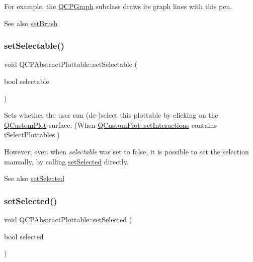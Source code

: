 For example, the \mbox{\hyperlink{class_q_c_p_graph}{Q\+C\+P\+Graph}} subclass draws its graph lines with this pen.

\begin{DoxySeeAlso}{See also}
\mbox{\hyperlink{class_q_c_p_abstract_plottable_a7a4b92144dca6453a1f0f210e27edc74}{set\+Brush}} 
\end{DoxySeeAlso}
\mbox{\label{class_q_c_p_abstract_plottable_a22c69299eb5569e0f6bf084877a37dc4}} 
\subsubsection{\texorpdfstring{set\+Selectable()}{setSelectable()}}
{\footnotesize\ttfamily void Q\+C\+P\+Abstract\+Plottable\+::set\+Selectable (\begin{DoxyParamCaption}\item[{bool}]{selectable }\end{DoxyParamCaption})}

Sets whether the user can (de-\/)select this plottable by clicking on the \mbox{\hyperlink{class_q_custom_plot}{Q\+Custom\+Plot}} surface. (When \mbox{\hyperlink{class_q_custom_plot_a5ee1e2f6ae27419deca53e75907c27e5}{Q\+Custom\+Plot\+::set\+Interactions}} contains i\+Select\+Plottables.)

However, even when {\itshape selectable} was set to false, it is possible to set the selection manually, by calling \mbox{\hyperlink{class_q_c_p_abstract_plottable_afbd5428c2952f59d952e11ab5cd79176}{set\+Selected}} directly.

\begin{DoxySeeAlso}{See also}
\mbox{\hyperlink{class_q_c_p_abstract_plottable_afbd5428c2952f59d952e11ab5cd79176}{set\+Selected}} 
\end{DoxySeeAlso}
\mbox{\label{class_q_c_p_abstract_plottable_afbd5428c2952f59d952e11ab5cd79176}} 
\subsubsection{\texorpdfstring{set\+Selected()}{setSelected()}}
{\footnotesize\ttfamily void Q\+C\+P\+Abstract\+Plottable\+::set\+Selected (\begin{DoxyParamCaption}\item[{bool}]{selected }\end{DoxyParamCaption})}

